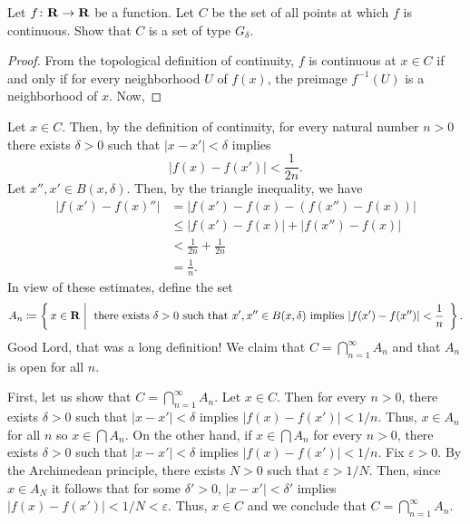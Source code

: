 \begin{problem}
Let $f\colon\mathbf{R}\to\mathbf{R}$ be a function. Let $C$ be the set of all points
at which $f$ is continuous. Show that $C$ is a set of type $G_\delta$.
\end{problem}
\begin{proof}
From the topological definition of continuity, $f$ is continuous at $x\in
C$ if and only if for every neighborhood $U$ of $f(x)$, the preimage
$f^{-1}(U)$ is a neighborhood of $x$. Now,
\end{proof}
Let $x\in C$. Then, by the definition of continuity, for every natural
number $n>0$ there exists $\delta>0$ such that $|x-x'|<\delta$ implies
\begin{equation}
\label{eq:continuity-2n}
\left|f(x)-f(x')\right|<\frac{1}{2n}.
\end{equation}
Let $x'',x'\in B(x,\delta)$. Then, by the triangle inequality, we have
\begin{equation}
\label{eq:n-estimates}
\begin{aligned}
|f(x')-f(x)''|&=\left|f(x')-f(x)-(f(x'')-f(x))\right|\\
              &\leq\left|f(x')-f(x)\right|+\left|f(x'')-f(x)\right|\\
              &<\frac{1}{2n}+\frac{1}{2n}\\
              &=\frac{1}{n}.
\end{aligned}
\end{equation}
In view of these estimates, define the set
\begin{equation}
\label{eq:a-n}
A_n\coloneqq
\left\{\,
x\in\mathbf{R}
\;\middle|\;
\text{
there exists $\delta>0$ such that $x',x''\in B(x,\delta)$ implies
$\left|f(x')-f(x'')\right|<\frac{1}{n}$
}
\,\right\}.
\end{equation}
Good Lord, that was a long definition! We claim that
$C=\bigcap_{n=1}^\infty A_n$ and that $A_n$ is open for all $n$.

First, let us show that $C=\bigcap_{n=1}^\infty A_n$. Let $x\in C$. Then for
every $n>0$, there exists $\delta>0$ such that $|x-x'|<\delta$ implies
$|f(x)-f(x')|<1/n$. Thus, $x\in A_n$ for all $n$ so $x\in\bigcap A_n$. On
the other hand, if $x\in\bigcap A_n$ for every $n>0$, there exists
$\delta>0$ such that $|x-x'|<\delta$ implies $|f(x)-f(x')|<1/n$. Fix
$\varepsilon>0$. By the Archimedean principle, there exists $N>0$ such that
$\varepsilon>1/N$. Then, since $x\in A_N$ it follows that for some
$\delta'>0$, $|x-x'|<\delta'$ implies
$\left|f(x)-f(x')\right|<1/N<\varepsilon$. Thus, $x\in C$ and we conclude
that $C=\bigcap_{n=1}^\infty A_n$.

